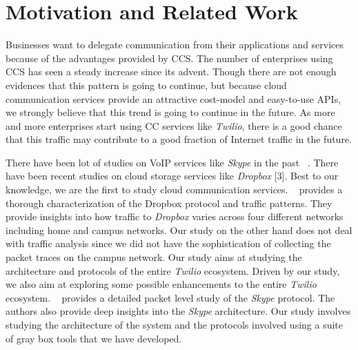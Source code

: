 \section{Motivation and Related Work}
\label{sec-motivationandrelated}
Businesses want to delegate communication from their applications and services because of the advantages provided by CCS. The number of enterprises using CCS has seen a steady increase since its advent. Though there are not enough evidences that this pattern is going to continue, but because cloud communication services provide an attractive cost-model and easy-to-use APIs, we strongly believe that this trend is going to continue in the future. As more and more enterprises start using CC services like \textit{Twilio}, there is a good chance that this traffic may contribute to a good fraction of Internet traffic in the future. \par
There have been lot of studies on VoIP services like \textit{Skype} in the past ~\cite{Baset04ananalysis}. There have been recent studies on cloud storage services like \textit{Dropbox} [3]. Best to our knowledge, we are the first to study cloud communication services. 
~\cite{Drago:2012:IDU:2398776.2398827} provides a thorough characterization of the Dropbox protocol and traffic patterns. They provide insights into how traffic to \textit{Dropbox} varies across four different networks including home and campus networks. Our study on the other hand does not deal with traffic analysis since we did not have the sophistication of collecting the packet traces on the campus network. Our study aims at studying the architecture and protocols of the entire \textit{Twilio} ecosystem. Driven by our study, we also aim at exploring some possible enhancements to the entire \textit{Twilio} ecosystem. ~\cite{Baset04ananalysis} provides a detailed packet level study of the \textit{Skype} protocol. The authors also provide deep insights into the \textit{Skype} architecture. Our study involves studying the architecture of the system and the protocols involved using a suite of gray box tools that we have developed. \par